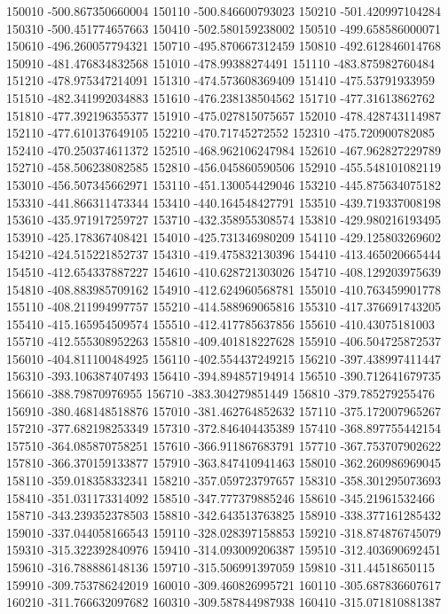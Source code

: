 {150010 -500.867350660004
150110 -500.846600793023
150210 -501.420997104284
150310 -500.451774657663
150410 -502.580159238002
150510 -499.658586000071
150610 -496.260057794321
150710 -495.870667312459
150810 -492.612846014768
150910 -481.476834832568
151010 -478.99388274491
151110 -483.875982760484
151210 -478.975347214091
151310 -474.573608369409
151410 -475.53791933959
151510 -482.341992034883
151610 -476.238138504562
151710 -477.31613862762
151810 -477.392196355377
151910 -475.027815075657
152010 -478.428743114987
152110 -477.610137649105
152210 -470.71745272552
152310 -475.720900782085
152410 -470.250374611372
152510 -468.962106247984
152610 -467.962827229789
152710 -458.506238082585
152810 -456.045860590506
152910 -455.548101082119
153010 -456.507345662971
153110 -451.130054429046
153210 -445.875634075182
153310 -441.866311473344
153410 -440.164548427791
153510 -439.719337008198
153610 -435.971917259727
153710 -432.358955308574
153810 -429.980216193495
153910 -425.178367408421
154010 -425.731346980209
154110 -429.125803269602
154210 -424.515221852737
154310 -419.475832130396
154410 -413.465020665444
154510 -412.654337887227
154610 -410.628721303026
154710 -408.129203975639
154810 -408.883985709162
154910 -412.624960568781
155010 -410.763459901778
155110 -408.211994997757
155210 -414.588969065816
155310 -417.376691743205
155410 -415.165954509574
155510 -412.417785637856
155610 -410.43075181003
155710 -412.555308952263
155810 -409.401818227628
155910 -406.504725872537
156010 -404.811100484925
156110 -402.554437249215
156210 -397.438997411447
156310 -393.106387407493
156410 -394.894857194914
156510 -390.712641679735
156610 -388.79870976955
156710 -383.304279851449
156810 -379.785279255476
156910 -380.468148518876
157010 -381.462764852632
157110 -375.172007965267
157210 -377.682198253349
157310 -372.846404435389
157410 -368.897755442154
157510 -364.085870758251
157610 -366.911867683791
157710 -367.753707902622
157810 -366.370159133877
157910 -363.847410941463
158010 -362.260986969045
158110 -359.018358332341
158210 -357.059723797657
158310 -358.301295073693
158410 -351.031173314092
158510 -347.777379885246
158610 -345.21961532466
158710 -343.239352378503
158810 -342.643513763825
158910 -338.377161285432
159010 -337.044058166543
159110 -328.028397158853
159210 -318.874876745079
159310 -315.322392840976
159410 -314.093009206387
159510 -312.403690692451
159610 -316.788886148136
159710 -315.506991397059
159810 -311.44518650115
159910 -309.753786242019
160010 -309.460826995721
160110 -305.687836607617
160210 -311.766632097682
160310 -309.587844987938
160410 -315.071810881387
}
